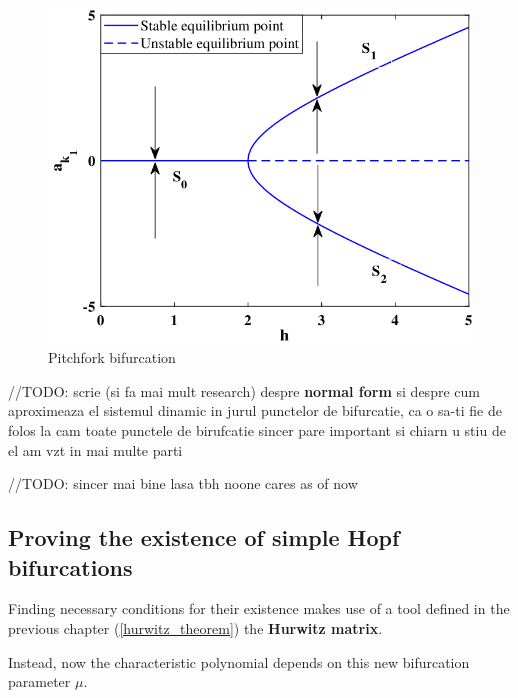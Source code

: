 \begin{figure}[H]
	\includegraphics[width=13cm]{math_pics/pitchfork-photo.png}
	\centering
	\caption{Pitchfork bifurcation}
\end{figure}

\hfill\break
//TODO: scrie (si fa mai mult research) despre  \textbf{normal form} si despre cum aproximeaza el sistemul dinamic in jurul punctelor de bifurcatie, ca o sa-ti fie de folos la cam toate punctele de birufcatie sincer pare important si chiarn u stiu de el am vzt in mai multe parti

//TODO: sincer mai bine lasa tbh noone cares as of now
\hfill\break

\subsection{Proving the existence of simple Hopf bifurcations}

Finding necessary conditions for their existence makes use of a tool defined in the previous chapter (\ref{hurwitz_theorem}) the \textbf{Hurwitz matrix}.

Instead, now the characteristic polynomial depends on this new bifurcation parameter $\mu$.

